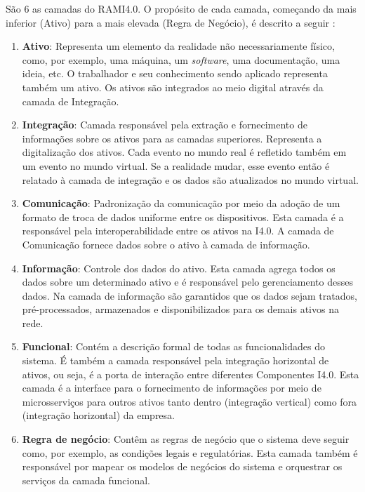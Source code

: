 	São 6 as camadas do RAMI4.0. O propósito de cada camada, começando da mais inferior (Ativo) para a mais elevada (Regra de Negócio), é descrito a seguir \cite{bitkom2016implementation}:
	
	\begin{enumerate}
		\item \textbf{Ativo}: Representa um elemento da realidade não necessariamente físico, como, por exemplo, uma máquina, um \textit{software}, uma documentação, uma ideia, etc. O trabalhador e seu conhecimento sendo aplicado representa também um ativo. Os ativos são integrados ao meio digital através da camada de Integração.
		
		\item \textbf{Integração}: Camada responsável pela extração e fornecimento de informações sobre os ativos para as camadas superiores. Representa a digitalização dos ativos. Cada evento no mundo real é refletido também em um evento no mundo virtual. Se a realidade mudar, esse evento então é relatado à camada de integração e os dados são atualizados no mundo virtual.
		
		\item \textbf{Comunicação}: Padronização da comunicação por meio da adoção de um formato de troca de dados uniforme entre os dispositivos. Esta camada é a responsável pela interoperabilidade entre os ativos na I4.0. A camada de Comunicação fornece dados sobre o ativo à camada de informação.
		
		\item \textbf{Informação}: Controle dos dados do ativo. Esta camada agrega todos os dados sobre um determinado ativo e é responsável pelo gerenciamento desses dados. Na camada de informação são garantidos que os dados sejam tratados, pré-processados, armazenados e disponibilizados para os demais ativos na rede.
		
		\item \textbf{Funcional}: Contém a descrição formal de todas as funcionalidades do sistema. É também a camada responsável pela integração horizontal de ativos, ou seja, é a porta de interação entre diferentes Componentes I4.0. Esta camada é a interface para o fornecimento de informações por meio de microsserviços para outros ativos tanto dentro (integração vertical) como fora (integração horizontal) da empresa.
			
		\item \textbf{Regra de negócio}: Contêm as regras de negócio que o sistema deve seguir como, por exemplo, as condições legais e regulatórias. Esta camada também é responsável por mapear os modelos de negócios do sistema e orquestrar os serviços da camada funcional.
	\end{enumerate}

